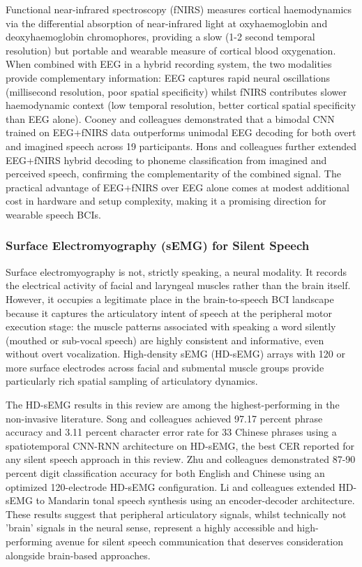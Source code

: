 Functional near-infrared spectroscopy (fNIRS) measures cortical haemodynamics via the differential absorption of near-infrared light at oxyhaemoglobin and deoxyhaemoglobin chromophores, providing a slow (1-2 second temporal resolution) but portable and wearable measure of cortical blood oxygenation. When combined with EEG in a hybrid recording system, the two modalities provide complementary information: EEG captures rapid neural oscillations (millisecond resolution, poor spatial specificity) whilst fNIRS contributes slower haemodynamic context (low temporal resolution, better cortical spatial specificity than EEG alone). Cooney and colleagues \cite{Cooney2022} demonstrated that a bimodal CNN trained on EEG+fNIRS data outperforms unimodal EEG decoding for both overt and imagined speech across 19 participants. Hons and colleagues \cite{Hons2026} further extended EEG+fNIRS hybrid decoding to phoneme classification from imagined and perceived speech, confirming the complementarity of the combined signal. The practical advantage of EEG+fNIRS over EEG alone comes at modest additional cost in hardware and setup complexity, making it a promising direction for wearable speech BCIs.

\subsubsection{Surface Electromyography (sEMG) for Silent Speech}

Surface electromyography is not, strictly speaking, a neural modality. It records the electrical activity of facial and laryngeal muscles rather than the brain itself. However, it occupies a legitimate place in the brain-to-speech BCI landscape because it captures the articulatory intent of speech at the peripheral motor execution stage: the muscle patterns associated with speaking a word silently (mouthed or sub-vocal speech) are highly consistent and informative, even without overt vocalization. High-density sEMG (HD-sEMG) arrays with 120 or more surface electrodes across facial and submental muscle groups provide particularly rich spatial sampling of articulatory dynamics.

The HD-sEMG results in this review are among the highest-performing in the non-invasive literature. Song and colleagues \cite{Song2023Silent} achieved 97.17 percent phrase accuracy and 3.11 percent character error rate for 33 Chinese phrases using a spatiotemporal CNN-RNN architecture on HD-sEMG, the best CER reported for any silent speech approach in this review. Zhu and colleagues \cite{Zhu2021} demonstrated 87-90 percent digit classification accuracy for both English and Chinese using an optimized 120-electrode HD-sEMG configuration. Li and colleagues \cite{Li2022} extended HD-sEMG to Mandarin tonal speech synthesis using an encoder-decoder architecture. These results suggest that peripheral articulatory signals, whilst technically not 'brain' signals in the neural sense, represent a highly accessible and high-performing avenue for silent speech communication that deserves consideration alongside brain-based approaches.

